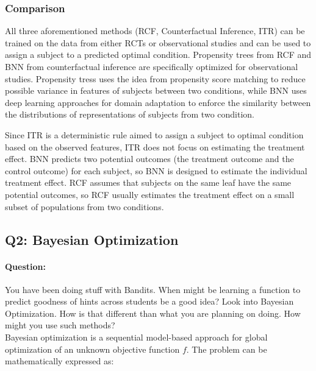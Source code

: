 \documentclass{article}
\begin{document}
\subsubsection{Comparison}
All three aforementioned methods (RCF,
Counterfactual Inference, ITR) can be trained on the data from either RCTs or
observational studies and can be used to assign a subject to a
predicted optimal condition. Propensity trees from RCF \cite{wager2015estimation} and BNN from
counterfactual inference \cite{Johansson2016-dh} are specifically
optimized for observational studies. Propensity tress uses the idea
from propensity score matching to reduce possible variance in features
of subjects between two conditions, while BNN uses deep learning
approaches for domain adaptation to enforce the similarity between the
distributions of representations of subjects from two condition.

Since ITR is a deterministic rule aimed to assign a subject to optimal
condition based on the observed features, ITR does not focus on
estimating the treatment effect. BNN predicts two potential outcomes
(the treatment outcome and the control outcome)
for each subject, so BNN is designed to estimate the individual
treatment effect. RCF assumes that subjects on the same leaf have the
same potential outcomes, so RCF usually estimates the treatment effect
on a small subset of populations from two conditions.

\subsection{Q2: Bayesian Optimization}
\paragraph{Question:} You have been doing stuff with Bandits. When might
be learning a function to predict goodness of hints across students be
a good idea?  Look into Bayesian Optimization.  How is that different
than what you are planning on doing.  How might you use such methods?
\\ [0.1in]

Bayesian optimization is a sequential model-based approach for global
optimization of an unknown objective function $f$. The problem can be
mathematically expressed as:
\end{document}
